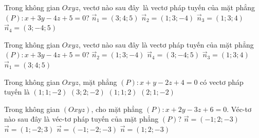 

\begin{ex}%
	Trong không gian $Oxyz$, vectơ nào sau đây~là vectơ pháp tuyến của mặt phẳng\xuongdong $(P)\colon x+3 y-4  z+5=0$?
	\choice 
		{$\overrightarrow{n}_{1}=(3; 4;  5)$}
		{\True  $\overrightarrow{n}_{2}=(1; 3;-4)$}
		{$\overrightarrow{n}_{3}=(1;  3; 4)$}
		 {$\overrightarrow{n}_{4}=(3; -4; 5)$}
\end{ex}

\begin{ex}%
	Trong không gian $Oxyz$, vectơ nào sau đây là vectơ  pháp tuyến của mặt phẳng $(P)\colon x+3y-4z+5=0$?
	\choice 
		{\True $\overrightarrow{n}_2=(1; 3;-4)$} 
		{$\overrightarrow{n}_4=(3;-4;  5)$}
		 {$\overrightarrow{n}_3=(1; 3; 4)$}
		{$\overrightarrow{n}_1=(3;  4; 5)$}
\end{ex}

\begin{ex}%
	 Trong không gian $Oxyz$, mặt phẳng $(P)\colon x+y-2z+4=0$ có vectơ pháp tuyến là
	 \choice
		 {\True $(1;1;-2)$}
		{$(3;2;-2)$} 
		{$(1;1;2)$} 
		{$(2;1;-2)$} 
\end{ex}

\begin{ex}%
	Trong không gian $(Oxyz)$, cho mặt phẳng $(P)\colon x+2y-3z+6=0$. Véc-tơ nào sau đây là véc-tơ  pháp tuyến của mặt phẳng $(P)$?
	 \choice
		 {$\overrightarrow{n}=(-1; 2;-3)$}
		{$\overrightarrow{n}=(1;-2;  3)$}
		 {$\overrightarrow{n}=(-1;-2;-3)$}
		{\True $\overrightarrow{n}=(1; 2;-3)$} 
\end{ex}

